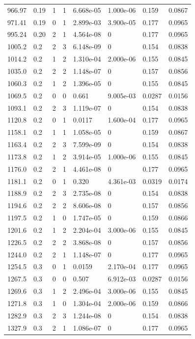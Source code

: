 \documentclass[preview]{standalone}
\begin{document}
{{{\begin{tabular}{L{1.2cm}C{1.2cm} C{0.3cm}C{0.5cm} C{1.4cm}C{1.4cm} C{1.4cm}C{1.4cm}}
  966.97  &  0.19  & 1     &  1 &  6.668e-05  & 1.000e-06  & 0.159 &  0.0867   \\ 
  971.41  &  0.19  & 0     &  1 &  2.899e-03  & 3.900e-05  & 0.177 &  0.0965   \\ 
  995.24  &  0.20  & 2     &  1 &  4.564e-08  & 0  & 0.177 &  0.0965   \\ 
  1005.2  &   0.2  & 2     &  3 &  6.148e-09  & 0  & 0.154 &  0.0838   \\ 
  1014.2  &   0.2  & 1     &  2 &  1.310e-04  & 2.000e-06  & 0.155 &  0.0845   \\ 
  1035.0  &   0.2  & 2     &  2 &  1.148e-07  & 0  & 0.157 &  0.0856   \\ 
  1060.3  &   0.2  & 1     &  2 &  1.396e-05  & 0  & 0.155 &  0.0845   \\ 
  1069.5  &   0.2  & 0     &  0 &  0.661  & 9.005e-03  & 0.0287 &  0.0156   \\ 
  1093.1  &   0.2  & 2     &  3 &  1.119e-07  & 0  & 0.154 &  0.0838   \\ 
  1120.8  &   0.2  & 0     &  1 &  0.0117  & 1.600e-04  & 0.177 &  0.0965   \\ 
  1158.1  &   0.2  & 1     &  1 &  1.058e-05  & 0  & 0.159 &  0.0867   \\ 
  1163.4  &   0.2  & 2     &  3 &  7.599e-09  & 0  & 0.154 &  0.0838   \\ 
  1173.8  &   0.2  & 1     &  2 &  3.914e-05  & 1.000e-06  & 0.155 &  0.0845   \\ 
  1176.0  &   0.2  & 2     &  1 &  4.461e-08  & 0  & 0.177 &  0.0965   \\ 
  1181.1  &   0.2  & 0     &  1 &  0.320  & 4.361e-03  & 0.0319 &  0.0174   \\ 
  1188.9  &   0.2  & 2     &  3 &  2.735e-08  & 0  & 0.154 &  0.0838   \\ 
  1194.6  &   0.2  & 2     &  2 &  8.606e-08  & 0  & 0.157 &  0.0856   \\ 
  1197.5  &   0.2  & 1     &  0 &  1.747e-05  & 0  & 0.159 &  0.0866   \\ 
  1201.6  &   0.2  & 1     &  2 &  2.204e-04  & 3.000e-06  & 0.155 &  0.0845   \\ 
  1226.5  &   0.2  & 2     &  2 &  3.868e-08  & 0  & 0.157 &  0.0856   \\ 
  1244.0  &   0.2  & 2     &  1 &  1.148e-07  & 0  & 0.177 &  0.0965   \\ 
  1254.5  &   0.3  & 0     &  1 &  0.0159  & 2.170e-04  & 0.177 &  0.0965   \\ 
  1267.5  &   0.3  & 0     &  0 &  0.507  & 6.912e-03  & 0.0287 &  0.0156   \\ 
  1269.6  &   0.3  & 1     &  2 &  2.496e-04  & 3.000e-06  & 0.155 &  0.0845   \\ 
  1271.8  &   0.3  & 1     &  0 &  1.304e-04  & 2.000e-06  & 0.159 &  0.0866   \\ 
  1282.9  &   0.3  & 2     &  3 &  1.244e-08  & 0  & 0.154 &  0.0838   \\ 
  1327.9  &   0.3  & 2     &  1 &  1.086e-07  & 0  & 0.177 &  0.0965   \\ 
\hline 
\end{tabular} 

}}}
\end{document}
